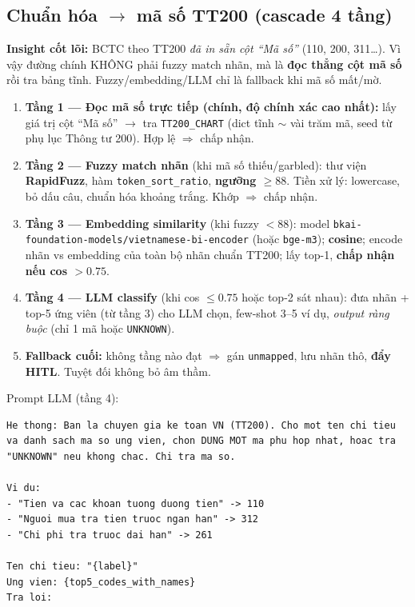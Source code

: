 \documentclass[11pt,a4paper]{article}
\begin{document}
\subsection{Chuẩn hóa $\rightarrow$ mã số TT200 (cascade 4 tầng)}
\label{sec:tt200}
\begin{ghichu}
\textbf{Insight cốt lõi:} BCTC theo TT200 \emph{đã in sẵn cột ``Mã số''} (110, 200, 311\dots). Vì vậy đường chính KHÔNG phải fuzzy match nhãn, mà là \textbf{đọc thẳng cột mã số} rồi tra bảng tĩnh. Fuzzy/embedding/LLM chỉ là fallback khi mã số mất/mờ.
\end{ghichu}

\begin{enumerate}
  \item \textbf{Tầng 1 --- Đọc mã số trực tiếp (chính, độ chính xác cao nhất):} lấy giá trị cột ``Mã số'' $\rightarrow$ tra \texttt{TT200\_CHART} (dict tĩnh $\sim$ vài trăm mã, seed từ phụ lục Thông tư 200). Hợp lệ $\Rightarrow$ chấp nhận.
  \item \textbf{Tầng 2 --- Fuzzy match nhãn} (khi mã số thiếu/garbled): thư viện \textbf{RapidFuzz}, hàm \texttt{token\_sort\_ratio}, \textbf{ngưỡng $\geq 88$}. Tiền xử lý: lowercase, bỏ dấu câu, chuẩn hóa khoảng trắng. Khớp $\Rightarrow$ chấp nhận.
  \item \textbf{Tầng 3 --- Embedding similarity} (khi fuzzy $<88$): model \texttt{bkai-foundation-models/vietnamese-bi-encoder} (hoặc \texttt{bge-m3}); \textbf{cosine}; encode nhãn vs embedding của toàn bộ nhãn chuẩn TT200; lấy top-1, \textbf{chấp nhận nếu cos $> 0.75$}.
  \item \textbf{Tầng 4 --- LLM classify} (khi cos $\leq 0.75$ hoặc top-2 sát nhau): đưa nhãn + top-5 ứng viên (từ tầng 3) cho LLM chọn, few-shot 3--5 ví dụ, \emph{output ràng buộc} (chỉ 1 mã hoặc \texttt{UNKNOWN}).
  \item \textbf{Fallback cuối:} không tầng nào đạt $\Rightarrow$ gán \texttt{unmapped}, lưu nhãn thô, \textbf{đẩy HITL}. Tuyệt đối không bỏ âm thầm.
\end{enumerate}

Prompt LLM (tầng 4):
\begin{Verbatim}
He thong: Ban la chuyen gia ke toan VN (TT200). Cho mot ten chi tieu
va danh sach ma so ung vien, chon DUNG MOT ma phu hop nhat, hoac tra
"UNKNOWN" neu khong chac. Chi tra ma so.

Vi du:
- "Tien va cac khoan tuong duong tien" -> 110
- "Nguoi mua tra tien truoc ngan han" -> 312
- "Chi phi tra truoc dai han" -> 261

Ten chi tieu: "{label}"
Ung vien: {top5_codes_with_names}
Tra loi:
\end{Verbatim}
\end{document}
